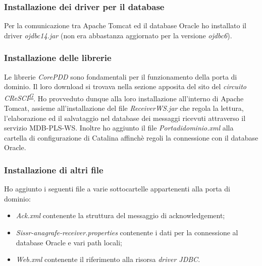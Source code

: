 \documentclass[a4paper]{article}
\begin{document}
\subsubsection{Installazione dei driver per il database}
Per la comunicazione tra Apache Tomcat ed il database Oracle ho installato il driver \textit{ojdbc14.jar} (non era abbastanza aggiornato per la versione \textit{ojdbc6}).

\subsubsection{Installazione delle librerie}
Le librerie \textit{CorePDD} sono fondamentali per il funzionamento della porta di dominio. Il loro download si trovava nella sezione apposita del sito del \textit{circuito CReSCI\textsuperscript{\hyperref[sec:gl]{G}}}. Ho provveduto dunque alla loro installazione all'interno di Apache Tomcat, assieme all'installazione del file \textit{ReceiverWS.jar} che regola la lettura, l'elaborazione ed il salvataggio nel database dei messaggi ricevuti attraverso il servizio MDB-PLS-WS. Inoltre ho aggiunto il file \textit{Portadidominio.xml} alla cartella di configurazione di Catalina affinchè regoli la connessione con il database Oracle.

\subsubsection{Installazione di altri file}
Ho aggiunto i seguenti file a varie sottocartelle appartenenti alla porta di dominio:
\begin{itemize}
	\item \textit{Ack.xml} contenente la struttura del messaggio di acknowledgement;
    \item \textit{Sissr-anagrafe-receiver.properties} contenente i dati per la connessione al database Oracle e vari path locali;
    \item \textit{Web.xml} contenente il riferimento alla risorsa \textit{driver JDBC}.
\end{itemize}
\end{document}
